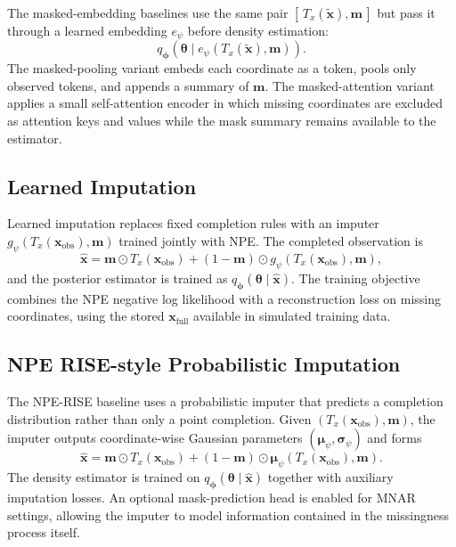 \documentclass{article} %
\providecommand{\xfull}{\mathbf{x}_{\mathrm{full}}}
\providecommand{\xobs}{\mathbf{x}_{\mathrm{obs}}}
\providecommand{\xtilde}{\widetilde{\mathbf{x}}}
\providecommand{\xhat}{\widehat{\mathbf{x}}}
\providecommand{\mvec}{\mathbf{m}}
\providecommand{\thetab}{\boldsymbol{\theta}}
\providecommand{\phib}{\boldsymbol{\phi}}
\begin{document}
The masked-embedding baselines use the same pair
$[\,T_x(\xtilde), \mvec\,]$ but pass it through a learned embedding
$e_\psi$ before density estimation:
\begin{equation}
  q_{\phib}(\thetab \mid e_\psi(T_x(\xtilde), \mvec)).
  \label{eq:masked-embedding}
\end{equation}
The masked-pooling variant embeds each coordinate as a token, pools only observed
tokens, and appends a summary of $\mvec$. The masked-attention variant applies a
small self-attention encoder in which missing coordinates are excluded as
attention keys and values while the mask summary remains available to the
estimator.

\subsection{Learned Imputation}
\label{sec:method-learned-imputation}

Learned imputation replaces fixed completion rules with an imputer
$g_\psi(T_x(\xobs), \mvec)$ trained jointly with NPE. The completed observation is
\begin{equation}
  \xhat
  =
  \mvec \odot T_x(\xobs)
  +
  (1 - \mvec) \odot g_\psi(T_x(\xobs), \mvec),
  \label{eq:learned-imputation}
\end{equation}
and the posterior estimator is trained as $q_{\phib}(\thetab \mid \xhat)$. The
training objective combines the NPE negative log likelihood with a reconstruction
loss on missing coordinates, using the stored $\xfull$ available in simulated
training data.

\subsection{NPE RISE-style Probabilistic Imputation}
\label{sec:method-npe-rise}

The NPE-RISE baseline uses a probabilistic imputer that predicts a completion
distribution rather than only a point completion. Given $(T_x(\xobs), \mvec)$,
the imputer outputs coordinate-wise Gaussian parameters
$(\boldsymbol{\mu}_\psi, \boldsymbol{\sigma}_\psi)$ and forms
\begin{equation}
  \xhat
  =
  \mvec \odot T_x(\xobs)
  +
  (1 - \mvec) \odot \boldsymbol{\mu}_\psi(T_x(\xobs), \mvec).
  \label{eq:npe-rise-completion}
\end{equation}
The density estimator is trained on $q_{\phib}(\thetab \mid \xhat)$ together with
auxiliary imputation losses. An optional mask-prediction head is enabled for MNAR
settings, allowing the imputer to model information contained in the missingness
process itself.
\end{document}
